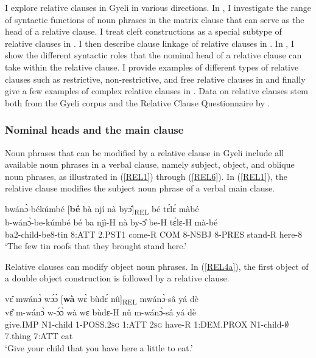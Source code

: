 I explore relative clauses in Gyeli in various directions. In , I investigate the range of syntactic functions of noun phrases in the matrix clause that can serve as the head of a relative clause. I treat cleft constructions as a special subtype of relative clauses in . I then describe clause linkage of relative clauses in . In , I show the different syntactic roles that the nominal head of a relative clause can take within the relative clause. I provide examples of different types of relative clauses such as restrictive, non-restrictive, and free relative clauses in  and finally give a few examples of complex relative clauses in . Data on relative clauses stem both from the Gyeli corpus and the Relative Clause Questionnaire by \citet{downing2010}.


\subsubsection{Nominal heads and the main clause}
\label{sec:NPheads}

Noun phrases that can be modified by a relative clause in Gyeli include all available noun phrases in a verbal clause, namely subject, object, and oblique noun phrases, as illustrated in (\ref{REL1}) through (\ref{REL6}). 
In (\ref{REL1}), the relative clause modifies the subject noun phrase of a verbal main clause.

\begin{exe} 
\ex\label{REL1}
 \glll  bwánɔ̀-békúmbé [{\bfseries bé} bà njí nà byɔ̂]\textsubscript{REL} bé tɛ́lɛ́ màbé  \\
         b-wánɔ̀-be-kúmbé bé ba njì-H nà by-ɔ̂ be-H tɛ́lɛ-H mà-bé \\
          ba2-child-be8-tin 8:ATT 2.PST1 come-R COM 8-NSBJ 8-PRES stand-R here-8   \\
    \trans `The few tin roofs that they brought stand here.'
\end{exe}

Relative clauses can modify object noun phrases. In (\ref{REL4a}), the first object of a double object construction is followed by a relative clause.

\begin{exe} 
\ex\label{REL4a} 
  \glll  vɛ̂ mwánɔ̀ wɔ́ɔ̀ [{\bfseries wà} wɛ̀ bùdɛ́ nû]\textsubscript{REL} mwánɔ̀-sâ yá dè \\
         vɛ̂ m-wánɔ̀ w-ɔ́ɔ̀ wà wɛ bùdɛ-H nû m-wánɔ̀-sâ yá dè \\
          give.IMP N1-child 1-POSS.2\textsc{sg} 1:ATT 2\textsc{sg} have-R 1:DEM.PROX N1-child-$\emptyset$7.thing 7:ATT eat \\
    \trans `Give your child that you have here a little to eat.'
\end{exe}

